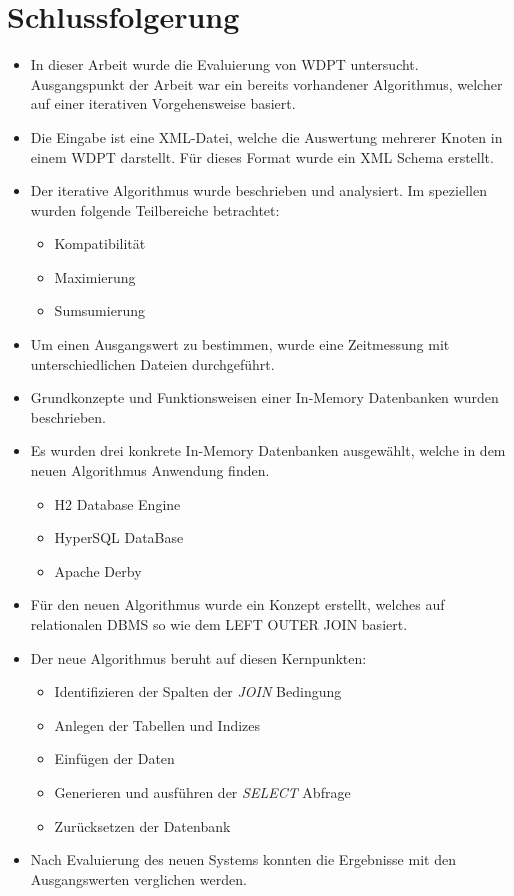 \documentclass[draft,final]{vutinfth} %
\begin{document}
\chapter{Schlussfolgerung}

\begin{itemize}
	\item In dieser Arbeit wurde die Evaluierung von WDPT untersucht. Ausgangspunkt der Arbeit war ein bereits vorhandener Algorithmus, welcher auf einer iterativen Vorgehensweise basiert.
	\item Die Eingabe ist eine XML-Datei, welche die Auswertung mehrerer Knoten in einem WDPT darstellt. Für dieses Format wurde ein XML Schema erstellt.
	\item Der iterative Algorithmus wurde beschrieben und analysiert. Im speziellen wurden folgende Teilbereiche betrachtet:
	\begin{itemize}
		\item Kompatibilität
		\item Maximierung
		\item Sumsumierung 
	\end{itemize}
	\item Um einen Ausgangswert zu bestimmen, wurde eine Zeitmessung mit unterschiedlichen Dateien durchgeführt. 
	\item Grundkonzepte und Funktionsweisen einer In-Memory Datenbanken wurden beschrieben. 
	\item Es wurden drei konkrete In-Memory Datenbanken ausgewählt, welche in dem neuen Algorithmus Anwendung finden.
	\begin{itemize}
		\item H2 Database Engine
		\item HyperSQL DataBase
		\item Apache Derby 
	\end{itemize}
	\item Für den neuen Algorithmus wurde ein Konzept erstellt, welches auf relationalen DBMS so wie dem LEFT OUTER JOIN basiert. 
	\item Der neue Algorithmus beruht auf diesen Kernpunkten:
	\begin{itemize}
		\item Identifizieren der Spalten der \textit{JOIN} Bedingung
		\item Anlegen der Tabellen und Indizes
		\item Einfügen der Daten
		\item Generieren und ausführen der \textit{SELECT} Abfrage
		\item Zurücksetzen der Datenbank
	\end{itemize} 
	\item Nach Evaluierung des neuen Systems konnten die Ergebnisse mit den Ausgangswerten verglichen werden.
\end{itemize}
   
\end{document}
